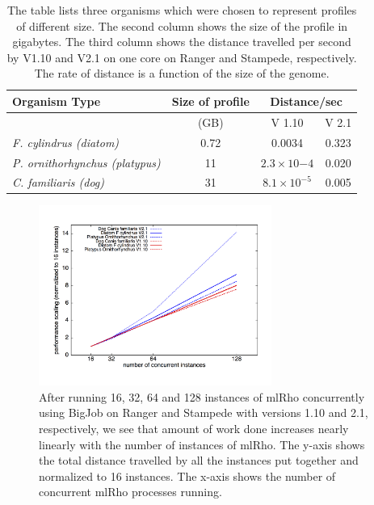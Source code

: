 \documentclass{sig-alternate}
\begin{document}
\begin{table}
\centering
\begin{tabular}{|p{3.3cm}|c| c |c  |     } \hline
{\scriptsize Organism Type	}	& {\scriptsize Size of profile}& \multicolumn{2}{|c|}{{\scriptsize Distance/sec} } \\ \hline
	& {\scriptsize (GB)}  & {\scriptsize V 1.10} & {\scriptsize V 2.1} \\ \hline
{\scriptsize {\it F. cylindrus (diatom)} } & {\scriptsize 0.72  }& {\scriptsize 0.0034} & {\scriptsize 0.323} \\ \hline
{\scriptsize {\it P. ornithorhynchus (platypus)} } & {\scriptsize 11 } &{\scriptsize $2.3{\times}10{-4}$ }&  {\scriptsize 0.020} \\ \hline
{\scriptsize {\it C. familiaris (dog)} } & {\scriptsize 31} & {\scriptsize $8.1{\times}10^{-5}$} & {\scriptsize 0.005} \\
\hline

\end{tabular}
\caption{The table lists three organisms which were chosen to represent profiles of different size. The second column shows the size of the profile in gigabytes. The third column shows the distance travelled per second by V1.10 and V2.1 on one core on Ranger and Stampede, respectively. The rate of distance is a function of the size of the genome.  } 
\label{table:cache_comp}
\end{table}


\begin{figure}[t] %
\centering
\includegraphics[width=0.68\textwidth]{figures/bj-scaling.png}
\caption{After running 16, 32, 64 and 128 instances of mlRho concurrently using BigJob on Ranger and Stampede with versions 1.10 and 2.1, respectively, we see that amount of work done increases nearly linearly with the number of instances of mlRho. The y-axis shows the total distance travelled by all the instances put together and normalized to 16 instances. The x-axis shows the number of concurrent mlRho processes running. }
\label{fig:bj-scaling}
\end{figure}
\end{document}
